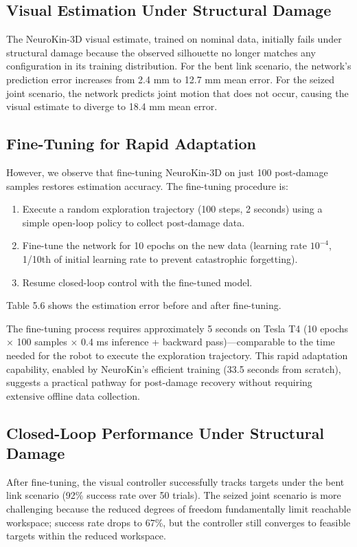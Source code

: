 \documentclass[12pt,a4paper,oneside]{report}
\begin{document}
\subsection{Visual Estimation Under Structural Damage}

The NeuroKin-3D visual estimate, trained on nominal data, initially fails under structural damage because the observed silhouette no longer matches any configuration in its training distribution. For the bent link scenario, the network's prediction error increases from 2.4 mm to 12.7 mm mean error. For the seized joint scenario, the network predicts joint motion that does not occur, causing the visual estimate to diverge to 18.4 mm mean error.

\subsection{Fine-Tuning for Rapid Adaptation}

However, we observe that fine-tuning NeuroKin-3D on just 100 post-damage samples restores estimation accuracy. The fine-tuning procedure is:
\begin{enumerate}
    \item Execute a random exploration trajectory (100 steps, 2 seconds) using a simple open-loop policy to collect post-damage data.
    \item Fine-tune the network for 10 epochs on the new data (learning rate $10^{-4}$, 1/10th of initial learning rate to prevent catastrophic forgetting).
    \item Resume closed-loop control with the fine-tuned model.
\end{enumerate}
Table 5.6 shows the estimation error before and after fine-tuning.

The fine-tuning process requires approximately 5 seconds on Tesla T4 (10 epochs $\times$ 100 samples $\times$ 0.4 ms inference + backward pass)---comparable to the time needed for the robot to execute the exploration trajectory. This rapid adaptation capability, enabled by NeuroKin's efficient training (33.5 seconds from scratch), suggests a practical pathway for post-damage recovery without requiring extensive offline data collection.

\subsection{Closed-Loop Performance Under Structural Damage}

After fine-tuning, the visual controller successfully tracks targets under the bent link scenario (92\% success rate over 50 trials). The seized joint scenario is more challenging because the reduced degrees of freedom fundamentally limit reachable workspace; success rate drops to 67\%, but the controller still converges to feasible targets within the reduced workspace.
\end{document}
